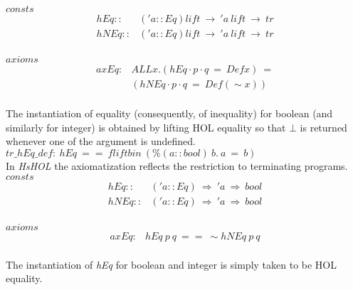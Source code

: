 \documentclass{llncs}
\begin{document}
\noindent $consts$ 
$$ \begin{array}{ll}
hEq :: & ('a::Eq) lift \ \to \ 'a \ lift \ \to \ tr \\
hNEq :: & ('a::Eq) lift \ \to \ 'a \ lift \ \to \ tr\\
\end{array}$$

\noindent $axioms$ 
$$\begin{array}{ll}
axEq: & ALL x. (hEq \cdot p \cdot q \ = \ Def x) \ = \\
 & (hNEq \cdot p \cdot q \ = \ Def (\sim x)) \\
\end{array}$$

\noindent The instantiation of equality (consequently, of inequality) for
boolean (and similarly for integer) is obtained by lifting HOL
equality so that $\bot$ is returned whenever one of the argument is
undefined.\\

\noindent $tr\_hEq\_def: \ hEq \ == \ fliftbin \ (\% (a::bool) \ b. \ a \ = \ b)$\\



\noindent In \emph{HsHOL} the axiomatization reflects the
restriction to terminating programs.\\

\noindent $consts$ 
$$\begin{array}{ll}
hEq :: & ('a::Eq) \ \Rightarrow \ 'a \ \Rightarrow \ bool \\
hNEq :: & ('a::Eq) \ \Rightarrow \ 'a \ \Rightarrow \ bool \\
\end{array}$$

\noindent $axioms$ 
$$\begin{array}{ll}
 axEq: & hEq \ p \ q \ == \ \sim hNEq \ p \ q \\
\end{array}$$

\noindent The instantiation of \emph{hEq} for boolean and integer is
simply taken to be HOL equality.

\end{document}
